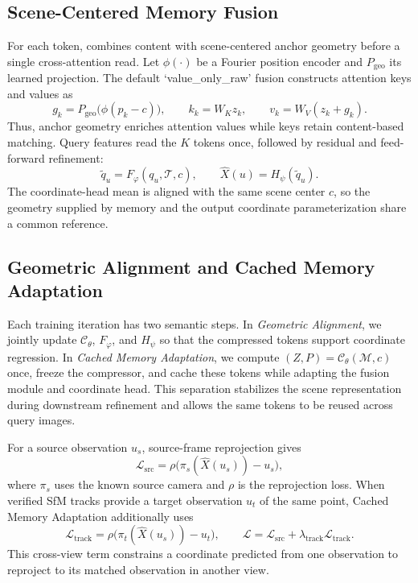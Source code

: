 \subsection{Scene-Centered Memory Fusion}

For each token, \method{} combines content with scene-centered anchor geometry before a single cross-attention read. Let $\phi(\cdot)$ be a Fourier position encoder and $P_{\mathrm{geo}}$ its learned projection. The default `value\_only\_raw' fusion constructs attention keys and values as
\begin{equation}
    g_k=P_{\mathrm{geo}}\bigl(\phi(p_k-c)\bigr),
    \qquad
    k_k=W_K z_k,
    \qquad
    v_k=W_V(z_k+g_k).
\end{equation}
Thus, anchor geometry enriches attention values while keys retain content-based matching. Query features read the $K$ tokens once, followed by residual and feed-forward refinement:
\begin{equation}
    \tilde q_u=F_{\varphi}(q_u,\mathcal{T},c),
    \qquad
    \hat{X}(u)=H_{\psi}(\tilde q_u).
\end{equation}
The coordinate-head mean is aligned with the same scene center $c$, so the geometry supplied by memory and the output coordinate parameterization share a common reference.

\subsection{Geometric Alignment and Cached Memory Adaptation}

Each training iteration has two semantic steps. In \emph{Geometric Alignment}, we jointly update $\mathcal{C}_{\theta}$, $F_{\varphi}$, and $H_{\psi}$ so that the compressed tokens support coordinate regression. In \emph{Cached Memory Adaptation}, we compute $(Z,P)=\mathcal{C}_{\theta}(\mathcal{M},c)$ once, freeze the compressor, and cache these tokens while adapting the fusion module and coordinate head. This separation stabilizes the scene representation during downstream refinement and allows the same tokens to be reused across query images.

For a source observation $u_s$, source-frame reprojection gives
\begin{equation}
    \mathcal{L}_{\mathrm{src}}
    =\rho\bigl(\pi_s(\hat{X}(u_s))-u_s\bigr),
\end{equation}
where $\pi_s$ uses the known source camera and $\rho$ is the reprojection loss. When verified SfM tracks provide a target observation $u_t$ of the same point, Cached Memory Adaptation additionally uses
\begin{equation}
    \mathcal{L}_{\mathrm{track}}
    =\rho\bigl(\pi_t(\hat{X}(u_s))-u_t\bigr),
    \qquad
    \mathcal{L}=\mathcal{L}_{\mathrm{src}}+
    \lambda_{\mathrm{track}}\mathcal{L}_{\mathrm{track}}.
\end{equation}
This cross-view term constrains a coordinate predicted from one observation to reproject to its matched observation in another view.
